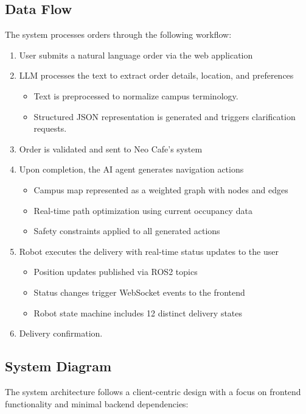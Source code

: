 \documentclass[12pt]{article}
\begin{document}
\subsection{Data Flow}

The system processes orders through the following workflow:

\begin{enumerate}
    \item User submits a natural language order via the web application
    \item LLM processes the text to extract order details, location, and preferences
    \begin{itemize}
        \item Text is preprocessed to normalize campus terminology.
        \item Structured JSON representation is generated and triggers clarification requests.
    \end{itemize}
    \item Order is validated and sent to Neo Cafe's system
    \item Upon completion, the AI agent generates navigation actions
    \begin{itemize}
        \item Campus map represented as a weighted graph with nodes and edges
        \item Real-time path optimization using current occupancy data
        \item Safety constraints applied to all generated actions
    \end{itemize}
    \item Robot executes the delivery with real-time status updates to the user
    \begin{itemize}
        \item Position updates published via ROS2 topics
        \item Status changes trigger WebSocket events to the frontend
        \item Robot state machine includes 12 distinct delivery states
    \end{itemize}
    \item Delivery confirmation.
\end{enumerate}

\subsection{System Diagram}

The system architecture follows a client-centric design with a focus on frontend functionality and minimal backend dependencies:
\end{document}
